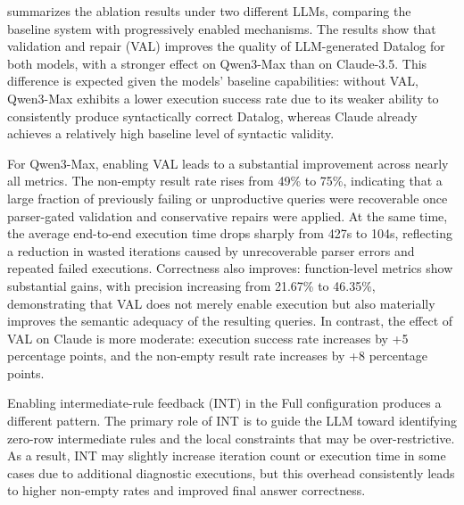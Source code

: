  summarizes the ablation results under two different LLMs, comparing the baseline system with progressively enabled mechanisms.
The results show that validation and repair (VAL) improves the quality of LLM-generated Datalog for both models, with a stronger effect on Qwen3-Max than on Claude-3.5. This difference is expected given the models' baseline capabilities: without VAL, Qwen3-Max exhibits a lower execution success rate due to its weaker ability to consistently produce syntactically correct \souffle{} Datalog, whereas Claude already achieves a relatively high baseline level of syntactic validity.

For Qwen3-Max, enabling VAL leads to a substantial improvement across nearly all metrics. The non-empty result rate rises from 49\% to 75\%, indicating that a large fraction of previously failing or unproductive queries were recoverable once parser-gated validation and conservative repairs were applied. At the same time, the average end-to-end execution time drops sharply from 427s to 104s, reflecting a reduction in wasted iterations caused by unrecoverable parser errors and repeated failed executions. Correctness also improves: function-level metrics show substantial gains, with precision increasing from 21.67\% to 46.35\%, demonstrating that VAL does not merely enable execution but also materially improves the semantic adequacy of the resulting queries.
In contrast, the effect of VAL on Claude is more moderate: execution success rate increases by +5 percentage points, and the non-empty result rate increases by +8 percentage points.

Enabling intermediate-rule feedback (INT) in the Full configuration produces a different pattern. The primary role of INT is to guide the LLM toward identifying zero-row intermediate rules and the local constraints that may be over-restrictive. As a result, INT may slightly increase iteration count or execution time in some cases due to additional diagnostic executions, but this overhead consistently leads to higher non-empty rates and improved final answer correctness.

\smallskip
\noindent{}

